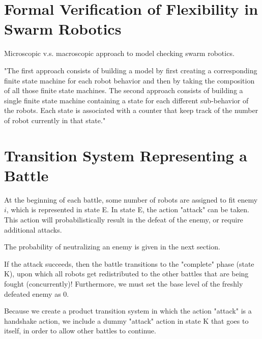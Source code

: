 \documentclass{article}
\theoremstyle{definition}
\begin{document}
\section{Formal Verification of Flexibility in Swarm Robotics}

Microscopic v.s. macroscopic
approach to model checking
swarm robotics.

"The first approach consists of building a model by first creating a corresponding
finite state machine for each robot behavior and then by taking the composition of
all those finite state machines. The second approach consists of building a single
finite state machine containing a state for each different sub-behavior of the robots.
Each state is associated with a counter that keep track of the number of robot
currently in that state."

\section{Transition System Representing a Battle}


At the beginning of each battle, some number
of robots are assigned to fit enemy $ i $,
which is represented in state E. In state E,
the action "attack" can be taken. This action
will probabilistically result in the defeat
of the enemy, or require additional attacks.

The probability of neutralizing an enemy
is given in the next section.

If the attack succeeds, then the battle transitions
to the "complete" phase (state K), upon which
all robots get redistributed to the other
battles that are being fought (concurrently)!
Furthermore, we must set the base level of the
freshly defeated enemy as 0.

Because we create a product transition system
in which the action "attack" is a handshake action,
we include a dummy "attack" action in state K
that goes to itself, in order to allow other
battles to continue.
\end{document}
